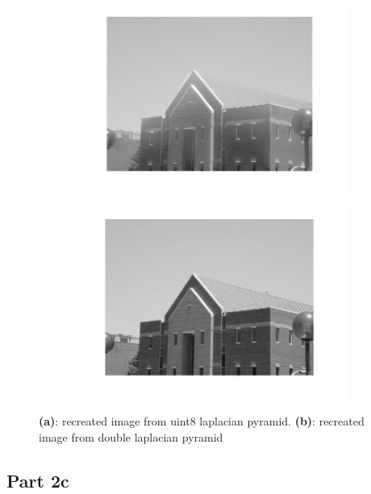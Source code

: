 \documentclass[a4paper]{iacas}
\begin{document}
\begin{figure}[!htbp]
	
	\begin{subfigure}[b]{0.48\textwidth}
		\includegraphics[width=\textwidth]{rec_1_building.jpg}
		\caption{}
		\label{fig:rec1b}
	\end{subfigure}
	\begin{subfigure}[b]{0.48\textwidth}
		\includegraphics[width=\textwidth]{rec_2_building.jpg}
		\caption{}
		\label{fig:rec2b}
	\end{subfigure}
	
	\caption{\textbf{(a)}: recreated image from uint8 laplacian pyramid. \textbf{(b)}: recreated image from double laplacian pyramid}
	
\end{figure}

\subsection{Part 2c}
\end{document}
